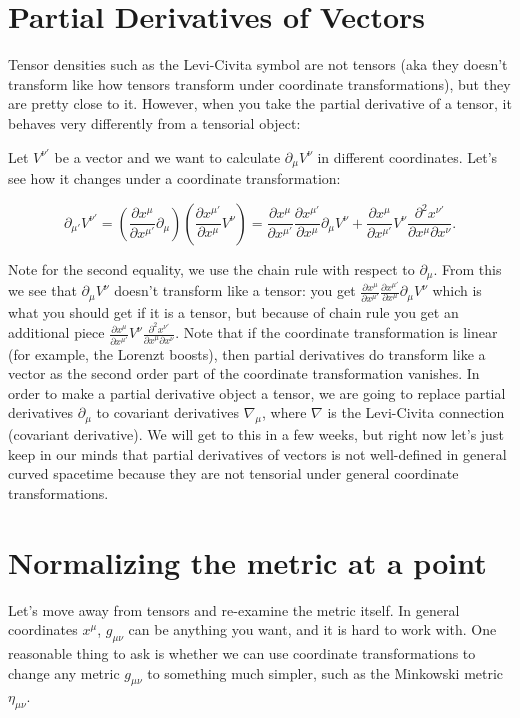 \documentclass[10pt]{article}
\newcommand{\xm}{x^\mu}
\newcommand{\xmp}{x^{\mu'}}
\newcommand{\xn}{x^\nu}
\newcommand{\xnp}{x^{\nu'}}
\newcommand{\gmn}{g_{\mu \nu}}
\newcommand{\dxm}{\frac {\partial \xm}{\partial \xmp}}
\newcommand{\dxminverse}{\frac {\partial \xmp}{\partial \xm}}
\newcommand{\emn}{\eta_{\mu \nu}}
\begin{document}
\section{Partial Derivatives of Vectors}\label{sec:class_style}

Tensor densities such as the Levi-Civita symbol are not tensors (aka they doesn't transform like how tensors transform under coordinate transformations), but they are pretty close to it. However, when you take the partial derivative of a tensor, it behaves very differently from a tensorial object:

Let $V^{\nu'}$ be a vector and we want to calculate $\partial_{\mu} V^{\nu}$ in different coordinates.  Let's see how it changes under a coordinate transformation:

$$\partial_{\mu'} V^{\nu'} = (\dxm \partial_\mu)(\dxminverse V^{\nu}) = \dxm \dxminverse \partial_{\mu} V^{\nu} + 
	\dxm V^{\nu} \frac{\partial^2 \xnp}{\partial \xm \partial \xn}.$$

Note for the second equality, we use the chain rule with respect to $\partial_{\mu}$. From this we see that $\partial_{\mu} V^{\nu}$ doesn't transform like a tensor: you get $\dxm \dxminverse \partial_{\mu} V^{\nu}$ which is what you should get if it is a tensor, but because of chain rule you get an additional piece $\dxm V^{\nu} \frac{\partial^2 \xnp}{\partial \xm \partial \xn}$. Note that if the coordinate transformation is linear (for example, the Lorenzt boosts), then partial derivatives do transform like a vector as the second order part  of the coordinate transformation vanishes. In order to make a partial derivative object a tensor, we are going to replace partial derivatives $\partial_\mu$ to covariant derivatives $\nabla_\mu$, where $\nabla$ is the Levi-Civita connection (covariant derivative). We will get to this in a few weeks, but right now let's just keep in our minds that partial derivatives of vectors is not well-defined in general curved spacetime because they are not tensorial under general coordinate transformations.

\section{Normalizing the metric at a point}\label{sec:class_style}

Let's move away from tensors and re-examine the metric itself. In general coordinates $\xm$, $\gmn$ can be anything you want, and it is hard to work with. One reasonable thing to ask is whether we can use coordinate transformations to change any metric $\gmn$ to something much simpler, such as the Minkowski metric $\emn$.
\end{document}
